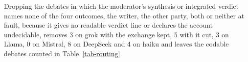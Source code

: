 Dropping the debates in which the moderator's
synthesis or integrated verdict names none of the four outcomes, the writer,
the other party, both or neither at fault, because it gives no readable
verdict line or declares the account undecidable, removes 3 on grok with the
exchange kept, 5 with it cut, 3 on Llama, 0 on Mistral, 8 on DeepSeek and 4
on haiku and leaves the codable debates counted in Table~\ref{tab-routing}.
